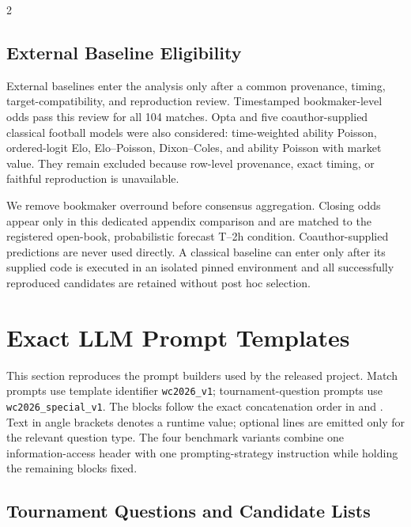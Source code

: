 \documentclass[sigconf,nonacm]{acmart}
\begin{document}
\begin{multicols}{2}
\subsection{External Baseline Eligibility}

External baselines enter the analysis only after a common provenance, timing, target-compatibility, and reproduction review. Timestamped bookmaker-level odds pass this review for all 104 matches. Opta and five coauthor-supplied classical football models were also considered: time-weighted ability Poisson, ordered-logit Elo, Elo--Poisson, Dixon--Coles, and ability Poisson with market value. They remain excluded because row-level provenance, exact timing, or faithful reproduction is unavailable.

We remove bookmaker overround before consensus aggregation. Closing odds appear only in this dedicated appendix comparison and are matched to the registered open-book, probabilistic forecast T--2h condition. Coauthor-supplied predictions are never used directly. A classical baseline can enter only after its supplied code is executed in an isolated pinned environment and all successfully reproduced candidates are retained without post hoc selection.
\end{multicols}

\twocolumn
\flushbottom

\clearpage
\section{Exact LLM Prompt Templates}
\label{app:prompts}

\begin{sloppypar}
This section reproduces the prompt builders used by the released project. Match prompts use template identifier \texttt{wc2026\_v1}; tournament-question prompts use \texttt{wc2026\_special\_v1}. The blocks follow the exact concatenation order in  and . Text in angle brackets denotes a runtime value; optional lines are emitted only for the relevant question type. The four benchmark variants combine one information-access header with one prompting-strategy instruction while holding the remaining blocks fixed.
\end{sloppypar}

\subsection{Tournament Questions and Candidate Lists}
\end{document}
